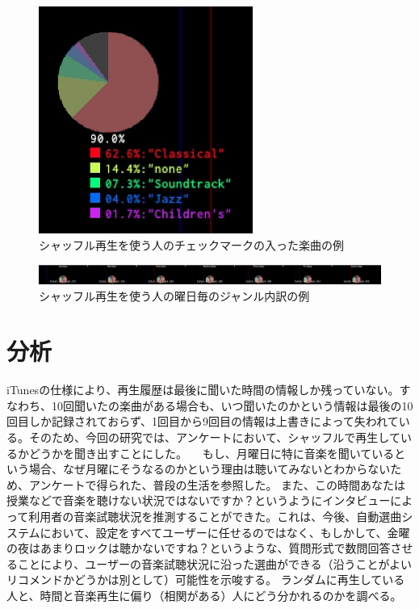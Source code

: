 \documentclass{jsarticle}
\begin{document}
\begin{figure}[h]
\begin{center}
\includegraphics[width=7cm]{taru_checkedItemGenreRatio.jpg}
\caption{シャッフル再生を使う人のチェックマークの入った楽曲の例}
\label{checkedItemsGenreMap_shuffle}
\end{center}
\end{figure}

\begin{figure}[h]
\begin{center}
\includegraphics[width=14cm]{taru_weekGenreRatio.jpg}
\caption{シャッフル再生を使う人の曜日毎のジャンル内訳の例}
\label{weekGenreMap_shuffle}
\end{center}
\end{figure}

\section{分析}
iTunesの仕様により、再生履歴は最後に聞いた時間の情報しか残っていない。すなわち、10回聞いたの楽曲がある場合も、いつ聞いたのかという情報は最後の10回目しか記録されておらず、1回目から9回目の情報は上書きによって失われている。そのため、今回の研究では、アンケートにおいて、シャッフルで再生しているかどうかを聞き出すことにした。
　もし、月曜日に特に音楽を聞いているという場合、なぜ月曜にそうなるのかという理由は聴いてみないとわからないため、アンケートで得られた、普段の生活を参照した。
また、この時間あなたは授業などで音楽を聴けない状況ではないですか？というようにインタビューによって利用者の音楽試聴状況を推測することができた。これは、今後、自動選曲システムにおいて、設定をすべてユーザーに任せるのではなく、もしかして、金曜の夜はあまりロックは聴かないですね？というような、質問形式で数問回答させることにより、ユーザーの音楽試聴状況に沿った選曲ができる（沿うことがよいリコメンドかどうかは別として）可能性を示唆する。
ランダムに再生している人と、時間と音楽再生に偏り（相関がある）人にどう分かれるのかを調べる。
\end{document}
